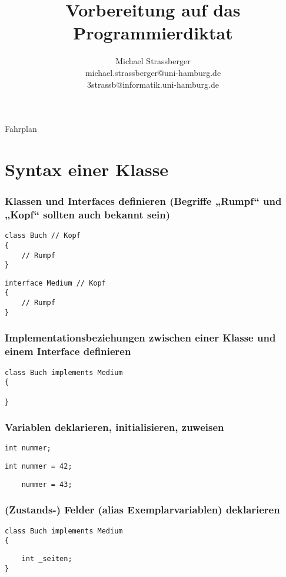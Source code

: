 \documentclass[mathserif]{beamer}
\title{Vorbereitung auf das Programmierdiktat}
\author{Michael Strassberger\\michael.strassberger@uni-hamburg.de\\3strassb@informatik.uni-hamburg.de}
\begin{document}
\begin{frame}
\titlepage
\end{frame}

\begin{frame}{Fahrplan}
\tableofcontents
\end{frame}

\section{Syntax einer Klasse}

\begin{frame}[fragile]
\frametitle{Klassen und Interfaces definieren (Begriffe „Rumpf“ und „Kopf“ sollten auch bekannt sein)}
\pause
    \begin{lstlisting}
class Buch // Kopf
{
    // Rumpf
}
    \end{lstlisting}
\pause
    \begin{lstlisting}
interface Medium // Kopf
{
    // Rumpf
}
    \end{lstlisting}
\end{frame}

\begin{frame}[fragile]
\frametitle{Implementationsbeziehungen zwischen einer Klasse und einem Interface definieren}
\pause
    \begin{lstlisting}
class Buch implements Medium 
{

}
    \end{lstlisting}
\end{frame}

\begin{frame}[fragile]
\frametitle{Variablen deklarieren, initialisieren, zuweisen}
\pause
    \begin{lstlisting}
int nummer;
    \end{lstlisting}
\pause
    \begin{lstlisting}
int nummer = 42;
    \end{lstlisting}
\pause
    \begin{lstlisting}
    nummer = 43;
    \end{lstlisting}
\end{frame}

\begin{frame}[fragile]
\frametitle{(Zustands-) Felder (alias Exemplarvariablen) deklarieren}
    \begin{lstlisting}
class Buch implements Medium 
{
    \end{lstlisting}
\pause
    \begin{lstlisting}
    int _seiten;
}
    \end{lstlisting}
\end{frame}
\end{document}
